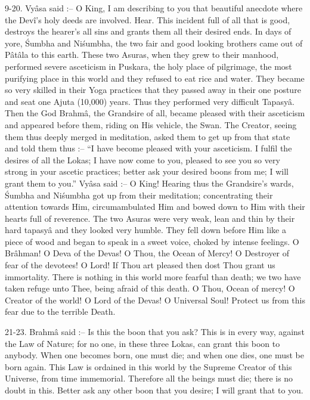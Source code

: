 9-20. Vy\^asa said :-- O King, I am describing to you that beautiful anecdote where the Dev\^i's holy deeds are involved. Hear. This incident full of all that is good, destroys the hearer's all sins and grants them all their desired ends. In days of yore, \'Sumbha and Ni\'sumbha, the two fair and good looking brothers came out of P\^at\^ala to this earth. These two Asuras, when they grew to their manhood, performed severe asceticism in Puskara, the holy place of pilgrimage, the most purifying place in this world and they refused to eat rice and water. They became so very skilled in their Yoga practices that they passed away in their one posture and seat one Ajuta (10,000) years. Thus they performed very difficult Tapasy\^a. Then the God Brahm\^a, the Grandsire of all, became pleased with their asceticism and appeared before them, riding on His vehicle, the Swan. The Creator, seeing them thus deeply merged in meditation, asked them to get up from that state and told them thus :-- ``I have become pleased with your asceticism. I fulfil the desires of all the Lokas; I have now come to you, pleased to see you so very strong in your ascetic practices; better ask your desired boons from me; I will grant them to you.'' Vy\^asa said :-- O King! Hearing thus the Grandsire's wards, \'Sumbha and Ni\'sumbha got up from their meditation; concentrating their attention towards Him, circumambulated Him and bowed down to Him with their hearts full of reverence. The two Asuras were very weak, lean and thin by their hard tapasy\^a and they looked very humble. They fell down before Him like a piece of wood and began to speak in a sweet voice, choked by intense feelings. O Br\^ahman! O Deva of the Devas! O Thou, the Ocean of Mercy! O Destroyer of fear of the devotees! O Lord! If Thou art pleased then dost Thou grant us immortality. There is nothing in this world more fearful than death; we two have taken refuge unto Thee, being afraid of this death. O Thou, Ocean of mercy! O Creator of the world! O Lord of the Devas! O Universal Soul! Protect us from this fear due to the terrible Death.

21-23. Brahm\^a said :-- Is this the boon that you ask? This is in every way, against the Law of Nature; for no one, in these three Lokas, can grant this boon to anybody. When one becomes born, one must die; and when one dies, one must be born again. This Law is ordained in this world by the Supreme Creator of this Universe, from time immemorial. Therefore all the beings must die; there is no doubt in this. Better ask any other boon that you desire; I will grant that to you.

